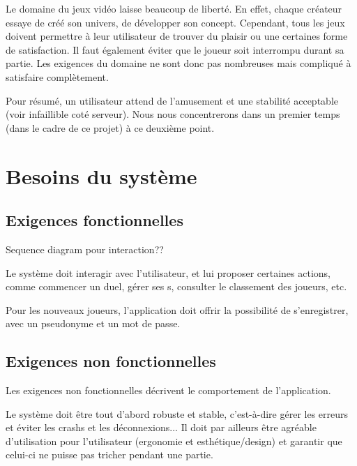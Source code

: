 \documentclass[11pt,a4paper]{article}
\begin{document}
Le domaine du jeux vidéo laisse beaucoup de liberté.  En effet,
chaque créateur essaye de créé son univers, de développer son
concept.  Cependant, tous les jeux doivent permettre à leur
utilisateur de trouver du plaisir ou une certaines forme de
satisfaction.  Il faut également éviter que le joueur soit
interrompu durant sa partie.  Les exigences du domaine ne sont
donc pas nombreuses mais compliqué à satisfaire complètement.


Pour résumé, un utilisateur attend de l'amusement et une stabilité
acceptable (voir infaillible coté serveur).  Nous nous
concentrerons dans un premier temps (dans le cadre de ce projet) à
ce deuxième point.




\section{Besoins du système}
\label{sec:besoins-sys}

\subsection{Exigences fonctionnelles}
\label{sec:exi-fonc-sys}


Sequence diagram pour interaction??

Le système doit interagir avec l'utilisateur, et lui proposer
certaines actions, comme commencer un duel, gérer ses s,
consulter le classement des joueurs, etc.

Pour les nouveaux joueurs, l'application doit offrir la possibilité de
s'enregistrer, avec un pseudonyme et un mot de passe.


\subsection{Exigences non fonctionnelles}
\label{sec:exi-nonfonc-sys}

Les exigences non fonctionnelles décrivent le comportement de
l'application.

Le système doit être tout d'abord robuste et stable, c'est-à-dire
gérer les erreurs et éviter les crashs et les déconnexions... Il doit
par ailleurs être agréable d'utilisation pour l'utilisateur (ergonomie
et esthétique/design) et garantir que celui-ci ne puisse pas tricher
pendant une partie.
\end{document}
